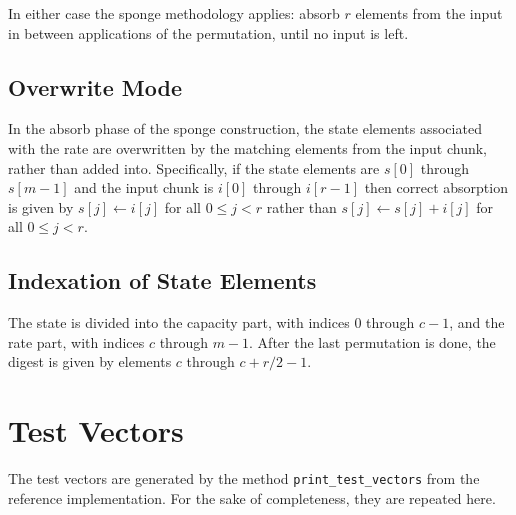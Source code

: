 \documentclass[a4paper]{article}
\begin{document}
In either case the sponge methodology applies: absorb $r$ elements from the input in between applications of the permutation, until no input is left.

\subsection{Overwrite Mode}

In the absorb phase of the sponge construction, the state elements associated with the rate are overwritten by the matching elements from the input chunk, rather than added into. Specifically, if the state elements are $s[0]$ through $s[m-1]$ and the input chunk is $i[0]$ through $i[r-1]$ then correct absorption is given by $s[j] \leftarrow i[j]$ for all $0 \leq j < r$ rather than $s[j] \leftarrow s[j] + i[j]$ for all $0 \leq j < r$.

\subsection{Indexation of State Elements}
\label{section:indexation-spec}

The state is divided into the capacity part, with indices $0$ through $c-1$, and the rate part, with indices $c$ through $m-1$. After the last permutation is done, the digest is given by elements $c$ through $c + r/2 - 1$.

\section{Test Vectors}

The test vectors are generated by the method \texttt{print\_test\_vectors} from the reference implementation. For the sake of completeness, they are repeated here.
\end{document}
